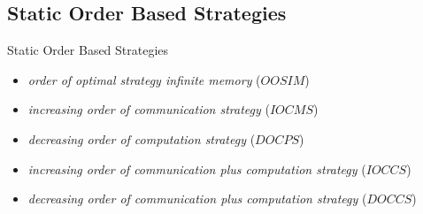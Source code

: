 \documentclass[mathserif,hyperref={pdfpagemode=FullScreen}]{beamer}
\begin{document}
\subsection{Static Order Based Strategies}
\begin{frame}{Static Order Based Strategies}
\begin{itemize}
	\vfill
	\item \textit{order of optimal strategy infinite memory} ($OOSIM$)
	\vfill
	\item \textit{increasing order of communication strategy} ($IOCMS$)
	\vfill
	\item \textit{decreasing order of computation strategy} ($DOCPS$)
	\vfill
	\item \textit{increasing order of communication plus computation strategy} ($IOCCS$)
	\vfill
	\item \textit{decreasing order of communication plus computation strategy} ($DOCCS$)
	\vfill
\end{itemize}
\end{frame}
\end{document}
